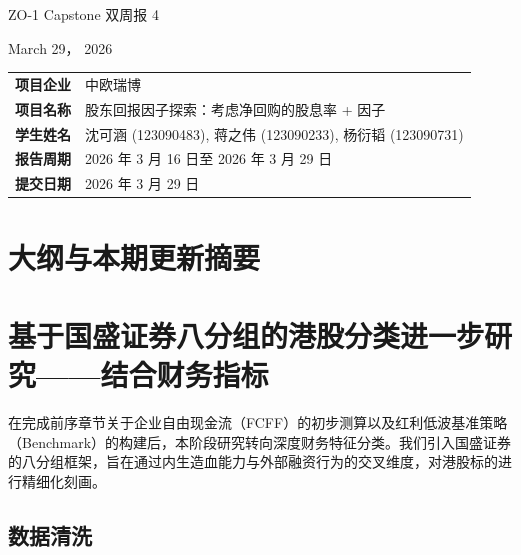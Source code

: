 \documentclass[a4paper,10pt]{article}
\begin{document}
\begin{center}
    \vspace*{1cm}
    {\Huge ZO-1 Capstone 双周报 4}
    
    \vspace{2.2cm}
    {\Large March 29， 2026}
    
    \vspace{1.2cm}
    \renewcommand{\arraystretch}{1.5}
    \begin{tabular}{@{} >{\bfseries}l l @{}}
        \toprule[1.5pt]
        项目企业 & 中欧瑞博 \\
        项目名称 & 股东回报因子探索：考虑净回购的股息率 + 因子 \\
        学生姓名 & 沈可涵 (123090483), 蒋之伟 (123090233), 杨衍韬 (123090731) \\
        报告周期 & 2026 年 3 月 16 日至 2026 年 3 月 29 日 \\
        提交日期 & 2026 年 3 月 29 日 \\
        \bottomrule[1.5pt]
    \end{tabular}
\end{center}

\newpage
\tableofcontents
\newpage


\section{大纲与本期更新摘要}



\section{基于国盛证券八分组的港股分类进一步研究——结合财务指标}


在完成前序章节关于企业自由现金流（FCFF）的初步测算以及红利低波基准策略（Benchmark）的构建后，本阶段研究转向深度财务特征分类。我们引入国盛证券的八分组框架，旨在通过内生造血能力与外部融资行为的交叉维度，对港股标的进行精细化刻画。

\subsection{数据清洗}
\end{document}
